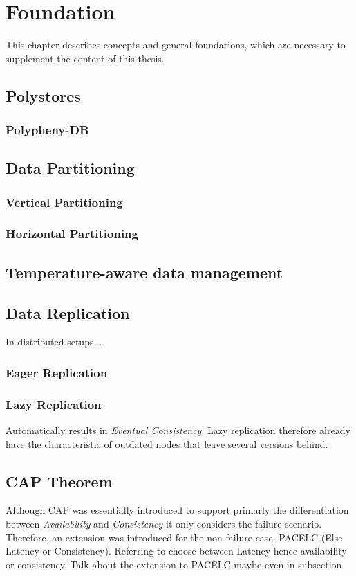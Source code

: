 \chapter{Foundation}
\label{c:Foundation}

This chapter describes concepts and general foundations, which are necessary to supplement 
the content of this thesis. 

\section{Polystores}

\subsection{Polypheny-DB}

\section{Data Partitioning}

\subsection{Vertical Partitioning}
\subsection{Horizontal Partitioning}

\section{Temperature-aware data management}

\section{Data Replication}
In distributed setups...

\subsection{Eager Replication}

\subsection{Lazy Replication}
Automatically results in \emph{Eventual Consistency}. Lazy replication therefore already have the characteristic of outdated nodes that leave several versions behind.


\section{CAP Theorem}

Although CAP was essentially introduced to support primarly the differentiation between \emph{Availability} and \emph{Consistency} it only considers the failure scenario.
Therefore, an extension was introduced for the non failure case.
PACELC (Else Latency or Consistency). Referring to choose between Latency hence availability or consistency. 
Talk about the extension to PACELC maybe even in subsection

